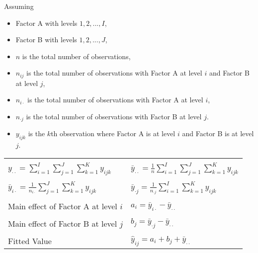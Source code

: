 \documentclass[10pt,landscape]{article}
\begin{document}
\begin{multicols}{2}
Assuming 

\begin{itemize}
   \item Factor A with levels $1, 2, ..., I$, 
   \item Factor B with levels $1, 2, ..., J$, 
   \item $n$ is the total number of observations,
   \item $n_{ij}$ is the total number of observations with Factor A at level $i$ and Factor B at level $j$, 
   \item $n_{i \cdot }$ is the total number of observations with Factor A at level $i$,
   \item $n_{\cdot j}$ is the total number of observations with Factor B at level $j$.
   \item $y_{ijk}$ is the $k$th observation where Factor A is at level $i$ and Factor B is at level $j$.
\end{itemize}

\begin{tabular}{@{}ll@{}}
        & \\
   $y_{\cdot \cdot} = \sum_{i = 1}^I \sum_{j = 1}^J \sum_{k=1}^K y_{ijk} $ & $\bar{y}_{\cdot \cdot} = \frac{1}{n}\sum_{i = 1}^I \sum_{j = 1}^J \sum_{k=1}^K y_{ijk} $ \\
        & \\
   $\bar{y}_{i \cdot} = \frac{1}{n_{i\cdot}} \sum_{j = 1}^J \sum_{k=1}^K y_{ijk} $ & $\bar{y}_{\cdot j} = \frac{1}{n_{\cdot j}} \sum_{i = 1}^I \sum_{k=1}^K y_{ijk} $ \\
        & \\
   Main effect of Factor A at level $i$ & $a_i = \bar{y}_{i \cdot} - \bar{y}_{\cdot \cdot}$ \\
        & \\
   Main effect of Factor B at level $j$ & $b_j = \bar{y}_{\cdot j} - \bar{y}_{\cdot \cdot}$ \\
        & \\
   Fitted Value & $\hat{y}_{ij} = a_i + b_j + \bar{y}_{\cdot \cdot}$
        & \\
\end{tabular}


\end{multicols}
\end{document}
